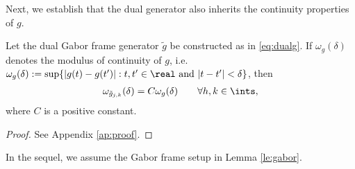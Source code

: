 \noindent Next, we establish that the dual generator \tg also inherits the continuity properties of $g$.
\begin{lem} \label{lem:modtg}
  Let the dual Gabor frame generator $\tilde{g}$ be constructed as in \eqref{eq:dualg}. If $\omega_g(\delta)$ denotes the modulus of continuity of $g$, i.e. $\omega_g(\delta) := \sup \{|g(t) - g(t')| : t,t' \in \real \text{ and } |t -t'| < \delta\}$,  then   
  \begin{align}
    \omega_{\tilde{g}_{j,k}}(\delta) = C \omega_g(\delta) \qquad \forall \hkints\notag,
    \label{}
  \end{align}
  where $C$ is a positive constant.
\end{lem}
\begin{proof}
  See Appendix \ref{ap:proof}.
\end{proof}
\noindent In the sequel,  we assume the Gabor frame setup in Lemma \eqref{le:gabor}.
\begin{comment}
Frames are quite general objects. What is needed is some control over the type of redundancies allowed in a frame. Without such a restriction results about the rate of convergence of the frame expansion would be impossible to come by. A Riesz basis provides just the type of control needed. Informally, a Riesz basis is a frame whose elements are all essential. 
\begin{defn}
  A sequence $\{f_k\}_{k \in \nats}$, with $f_k \in \LtwoR$ for all $k$, is a Riesz basis  if there exists an orthonormal basis $\{\xi_k\}_{k \in \nats}$ of \LtwoR and  a bounded invertible operator $T: \LtwoR \to \LtwoR$ such that $f_k = T \xi_k$, for all $k$. 
\end{defn}
\noindent A frame is Riesz basis if it is \emph{complete}; i.e. whenever $\langle f,f_k\rangle = 0$ for all $k$ then $f =0$; and there are positive constants $c,C$ such that 
\begin{align}
  c\sum_{k=1}^N\vert c_k\vert^2 \le \left\Vert \sum_{k =1}^N c_k f_k \right \Vert^2 \le C\sum_{k=1}^N\vert c_k\vert^2,
  \label{}
\end{align}
for all finite sequences $\{c_k\}_{1\le k\le N}$. This is equivalent to the condition
\begin{align}
  c\le \sumi \vert\hat{f}(\omega + 2 \pi k)\vert \le C, \qquad \forall\omega \in [0,2\pi], 
  \label{}
\end{align}
where $\hat{f}$ is the Fourier transform of $f$. 
To proceed in our analysis, we specialize further the type of Riesz basis to those that may be generated by a single element (function), $f \in \Ltwo$.  The entire Riesz basis is then generated by translating $f$ across the closed unit interval. By appropriately scaling the $f$ we end up with different levels of granularity in the representation. That is, we have in mind a collection\footnote{See \cite{Unser1997} for further elaboration on these ideas.} $\{f_{h,k}\}_{k, h \in \ints}$, where $f_{h,k} :=  f(x/h - k)$. We denote the function space generated by this basis as follows:
\begin{align}
  V_h(f) := \left\{\sumi c_{h,k} f_{h,k} : \{c_{h,k}\} \in \ltwo\right\}
  \label{}
\end{align}
\end{comment}



